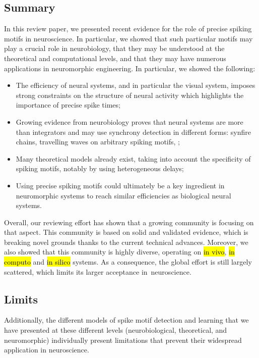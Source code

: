 \documentclass[brainsci, %
               review,accept,pdftex,moreauthors
               ]{Definitions/mdpi}
\begin{document}
\subsection{Summary}
In this review paper, we presented recent evidence for the role of precise spiking motifs in neuroscience. In particular, we showed that such particular motifs may play a crucial role in neurobiology, that they may be understood at the theoretical and computational levels, and that they may have numerous applications in neuromorphic engineering. In particular, we showed the following:
\begin{itemize}
  \item  The efficiency of neural systems, and in particular the visual system, imposes strong constraints on the structure of neural activity which highlights the importance of precise spike times;
  \item  Growing evidence from neurobiology proves that neural systems are more than integrators and may use synchrony detection in different forms: synfire chains, travelling waves on arbitrary spiking motifs, ;
  \item  Many theoretical models already exist, taking into account the specificity of spiking motifs, notably by using heterogeneous delays;
  \item  Using precise spiking motifs could ultimately be a key ingredient in neuromorphic systems to reach similar efficiencies as biological neural systems.
\end{itemize}

 Overall, our reviewing effort has shown that a growing community is focusing on that aspect. This community is based on solid and validated evidence, which is breaking novel grounds thanks to the current technical advances. Moreover, we also showed that this community is highly diverse, operating on {\hl{in vivo}}, {\hl{in computo}} and {\hl{in silico}} systems. As a consequence, the global effort is still largely scattered, which limits its larger acceptance in~neuroscience. 

\subsection{Limits}
Additionally, the different models of spike motif detection and learning that we have presented at these different levels (neurobiological, theoretical, and neuromorphic) individually present limitations that prevent their widespread application in neuroscience.
\end{document}
